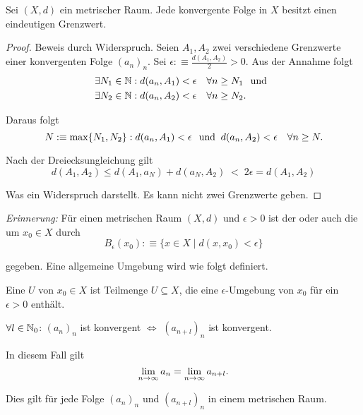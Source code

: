 \begin{thm}
	Sei $(X,d)$ ein metrischer Raum. Jede konvergente Folge in $X$ besitzt einen eindeutigen Grenzwert.
\end{thm}
\begin{proof} Beweis durch Widerspruch. Seien $A_1, A_2$ zwei verschiedene Grenzwerte einer konvergenten Folge $(a_n)_n$. Sei $\epsilon :\equiv \frac{d(A_1, A_2)}{2} > 0$. Aus der Annahme folgt
	\begin{equation}
		\begin{aligned}
			\exists N_1 \in \mathbb{N}: d(a_n, A_1) &< \epsilon \quad \forall n \geq N_1 \;\;\, \text{und}\;\; \\
			\exists N_2 \in \mathbb{N}: d(a_n, A_2) &< \epsilon \quad \forall n \geq N_2.
		\end{aligned}
	\end{equation}
	
	Daraus folgt
	\begin{equation}
		 N :\equiv \max \{ N_1, N_2 \} : d(a_n, A_1) < \epsilon \;\;\, \text{und}\;\; d(a_n, A_2) < \epsilon \quad \forall n \geq N.
	\end{equation}
	
	Nach der Dreiecksungleichung gilt
	\begin{equation}
		d(A_1, A_2) \leq d(A_1, a_N) + d(a_N, A_2) \; \boxed{<} \;  2\epsilon = d(A_1, A_2)
	\end{equation}
	
	Was ein Widerspruch darstellt. Es kann nicht zwei Grenzwerte geben.
\end{proof}

\emph{Erinnerung:} Für einen metrischen Raum $(X,d)$ und 
$\epsilon > 0$ ist der  oder auch die  um $x_0\in X$ durch
\begin{equation}
	B_{\epsilon} (x_0) :\equiv \{ x\in X \mid d(x, x_0) <\epsilon \}
\end{equation}

gegeben. Eine allgemeine Umgebung wird wie folgt definiert.

\setcounter{thm}{23}
\begin{mydef}[Umgebung]
	Eine  $U$ von $x_0 \in X$ ist Teilmenge $U \subseteq X$, die eine $\epsilon$-Umgebung von $x_0$ für ein $\epsilon > 0$ enthält.
\end{mydef}

\begin{thm}[Indexverschiebung]
	$\forall l \in \mathbb{N}_0$: $(a_n)_n$ ist konvergent $\iff$ $(a_{n+l})_n$ ist konvergent.
	
	In diesem Fall gilt
	\begin{equation}
		\lim_{n \to \infty} a_n = \lim_{n \to \infty} a_{n+l}.
	\end{equation}
	
	Dies gilt für jede Folge $(a_n)_n$ und $(a_{n+l})_n$ in einem metrischen Raum.
\end{thm}



